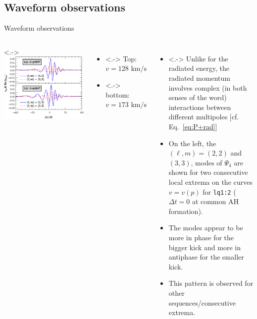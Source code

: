 \documentclass[smaller,aspectratio=169]{beamer}
\begin{document}
\subsection{Waveform observations}
\begin{frame}{Waveform observations}
	\begin{columns}
			\only<.->{
				\centering
				\includegraphics[width=\columnwidth]{mode-kick-extrema.eps}
			}
			\vspace{-1.5em}
			\begin{itemize}
 				\item<.-> Top: $v=128\text{ km/s}$
 				\item<.-> bottom: $v=173\text{ km/s}$
	 		\end{itemize}
			\begin{itemize}
				\item<.->
					Unlike for the radiated energy, the radiated momentum
					involves complex (in both senses of the word) 
					\alert{interactions} between different multipoles
					[cf. Eq.~\eqref{eq:P+rad}]
				\item<+->
					On the left, the $(\ell,m)=(2,2)$ and $(3,3)$, 
					modes of $\Psi_4$ are shown for two \alert{consecutive} 
					local extrema on the
					curves $v=v(p)$ for \texttt{lq1:2} ($\Delta t=0$ at common 
					AH formation).
				\item<+->
					The modes appear to be more \alert{in phase} for the 
					bigger kick 
					and more \alert{in antiphase} for the smaller kick.
				\item<+->
					This pattern is observed for other 
					sequences/consecutive extrema.
			\end{itemize}
	\end{columns}
\end{frame}
\end{document}
